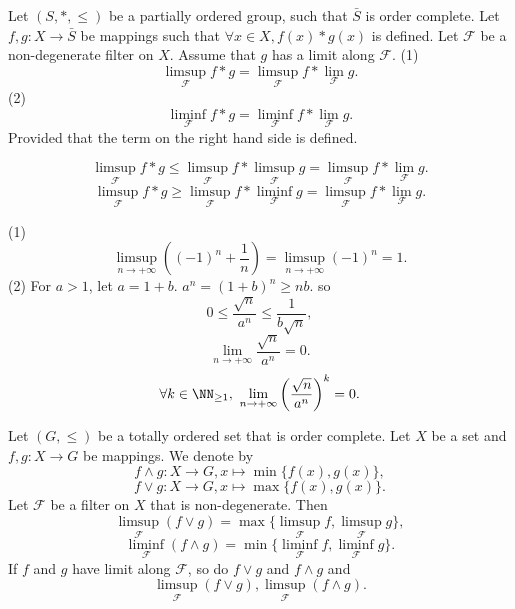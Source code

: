\begin{corollaryenv}
    Let $(S,*,\le)$ be a partially ordered group, such that $\bar{S}$ is order complete. Let $f,g: X\longrightarrow \bar{S}$ be mappings such that $\forall x\in X, f(x)*g(x)$ is defined. Let $\mathcal{F}$ be a  non-degenerate filter on $X$. Assume that $g$ has a limit along $\mathcal{F}$.
    \newline
    (1) $$\limsup_{\mathcal{F}}f*g=\limsup_{\mathcal{F}}f*\lim_{\mathcal{F}}g.$$
    (2) $$\liminf_{\mathcal{F}}f*g=\liminf_{\mathcal{F}}f*\lim_{\mathcal{F}}g.$$
    Provided that the term on the right hand side is defined.
\end{corollaryenv}
\begin{proofenv}
 $$\limsup_{\mathcal{F}}f*g\le \limsup_{\mathcal{F}}f*\limsup_{\mathcal{F}}g=\limsup_{\mathcal{F}}f*\lim_{\mathcal{F}}g.$$
    $$\limsup_{\mathcal{F}}f*g\ge \limsup_{\mathcal{F}}f*\liminf_{\mathcal{F}}g=\limsup_{\mathcal{F}}f*\lim_{\mathcal{F}}g.$$
\end{proofenv}
\begin{exampleenv}
    \quad \newline
    (1)
    $$\limsup_{n\rightarrow+\infty}\left((-1)^n+\frac{1}{n}\right)=\limsup_{n\rightarrow+\infty}(-1)^n=1.$$
    (2) For $a>1$, let $a=1+b$. $a^n=(1+b)^n\ge nb$. so 
    $$0\le \frac{\sqrt{n}}{a^n}\le \frac{1}{b\sqrt{n}},$$
    $$\lim_{n\rightarrow +\infty}\frac{\sqrt{n}}{a^n}=0.$$
    $$\forall k\in \NN_{\ge 1}, \ \lim_{n\rightarrow+\infty}\left(\frac{\sqrt{n}}{a^n}\right)^k=0.$$
\end{exampleenv}
\begin{propositionenv}
    Let $(G,\le)$ be a totally ordered set that is order complete. Let $X$ be a set and $f,g:X\longrightarrow G$ be mappings. We denote by 
    $$f\wedge g:X\longrightarrow G, x\longmapsto \min\{f(x),g(x)\},$$
    $$f\vee g:X\longrightarrow G, x\longmapsto \max\{f(x),g(x)\}.$$
    Let $\mathcal{F}$ be a filter on $X$ that is non-degenerate. Then 
    $$\limsup_\mathcal{F}\left(f\vee g\right)=\max\{\limsup_\mathcal{F} f,\limsup_\mathcal{F} g\},$$
    $$\liminf_\mathcal{F}\left(f\wedge g\right)=\min\{\liminf_\mathcal{F} f,\liminf_\mathcal{F} g\}.$$
    If $f$ and $g$ have limit along $\mathcal{F}$, so do $f\vee g$ and $f \wedge g$ and $$\limsup_\mathcal{F}\left(f\vee g\right),\limsup_\mathcal{F}\left(f\wedge g\right).$$
\end{propositionenv}
